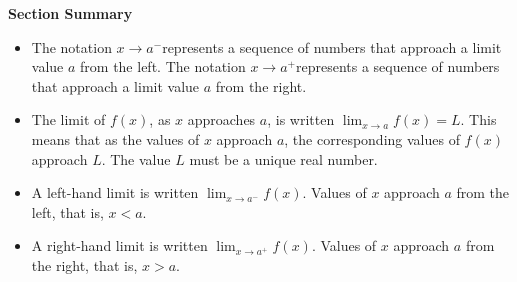 \documentclass{report}
\begin{document}
\bigbreak \noindent
\begin{large}
  \textbf{Section Summary} 
\end{large}
\bigbreak
\begin{minipage}{0.4\textwidth}
\begin{itemize}
  \item The notation $x \rightarrow a^{-}$represents a sequence of numbers that approach a limit value $a$ from the left. The notation $x \rightarrow a^{+}$represents a sequence of numbers that approach a limit value $a$ from the right.
  
  \item The limit of $f(x)$, as $x$ approaches $a$, is written $\lim _{x \rightarrow a} f(x)=L$. This means that as the values of $x$
approach $a$, the corresponding values of $f(x)$ approach $L$. The value $L$ must be a unique real number.
\end{itemize}	
\end{minipage}
\begin{minipage}{0.5\textwidth}
\begin{itemize}
  \item A left-hand limit is written $\lim _{x \rightarrow a^{-}} f(x)$. Values of $x$ approach $a$ from the left, that is, $x<a$.
  \item A right-hand limit is written $\lim _{x \rightarrow a^{+}} f(x)$. Values of $x$ approach $a$ from the right, that is, $x>a$.
\end{itemize}	
\end{minipage}
\pagebreak
\end{document}

